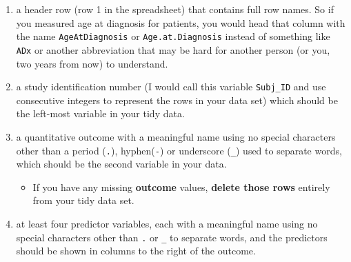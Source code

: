 \documentclass[]{book}
\providecommand{\tightlist}{%
  \setlength{\itemsep}{0pt}\setlength{\parskip}{0pt}}
\theoremstyle{definition}
\theoremstyle{definition}
\theoremstyle{definition}
\theoremstyle{remark}
\begin{document}
\begin{enumerate}
\def\labelenumi{\arabic{enumi}.}
\tightlist
\item
  a header row (row 1 in the spreadsheet) that contains full row names.
  So if you measured age at diagnosis for patients, you would head that
  column with the name \texttt{AgeAtDiagnosis} or
  \texttt{Age.at.Diagnosis} instead of something like \texttt{ADx} or
  another abbreviation that may be hard for another person (or you, two
  years from now) to understand.
\item
  a study identification number (I would call this variable
  \texttt{Subj\_ID} and use consecutive integers to represent the rows
  in your data set) which should be the left-most variable in your tidy
  data.
\item
  a quantitative outcome with a meaningful name using no special
  characters other than a period (\texttt{.}), hyphen(\texttt{-}) or
  underscore (\texttt{\_}) used to separate words, which should be the
  second variable in your data.

  \begin{itemize}
  \tightlist
  \item
    If you have any missing \textbf{outcome} values, \textbf{delete
    those rows} entirely from your tidy data set.
  \end{itemize}
\item
  at least four predictor variables, each with a meaningful name using
  no special characters other than \texttt{.} or \texttt{\_} to separate
  words, and the predictors should be shown in columns to the right of
  the outcome.


\end{enumerate}
\end{document}
